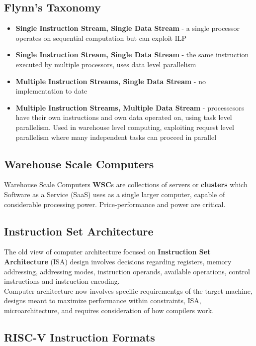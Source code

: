 \documentclass[11pt]{article}
\begin{document}
\subsection{Flynn's Taxonomy}

\begin{itemize}
    \item \textbf{Single Instruction Stream, Single Data Stream} - a single processor operates on sequential computation but can exploit ILP
    \item \textbf{Single Instruction Stream, Single Data Stream} - the same instruction executed by multiple processors, uses data level parallelism
    \item \textbf{Multiple Instruction Streams, Single Data Stream} - no implementation to date
    \item \textbf{Multiple Instruction Streams, Multiple Data Stream} - processesors have their own instructions and own data operated on, using task level parallelism. Used in warehouse level computing, exploiting request level parallelism where many independent tasks can proceed in parallel
\end{itemize}

\subsection{Warehouse Scale Computers}

Warehouse Scale Computers \textbf{WSC}s are collections of servers or \textbf{clusters} which Software as a Service (SaaS) uses as a single larger computer, capable of considerable processing power. Price-performance and power are critical.

\subsection{Instruction Set Architecture}

The old view of computer architecture focused on \textbf{Instruction Set Architecture} (ISA) design involves decisions regarding registers, memory addressing, addressing modes, instruction operands, available operations, control instructions and instruction encoding.\\

Computer architecture now involves specific requirementgs of the target machine, designs meant to maximize performance within constraints, ISA, microarchitecture, and requires consideration of how compilers work.

\subsection{RISC-V Instruction Formats}
\end{document}
